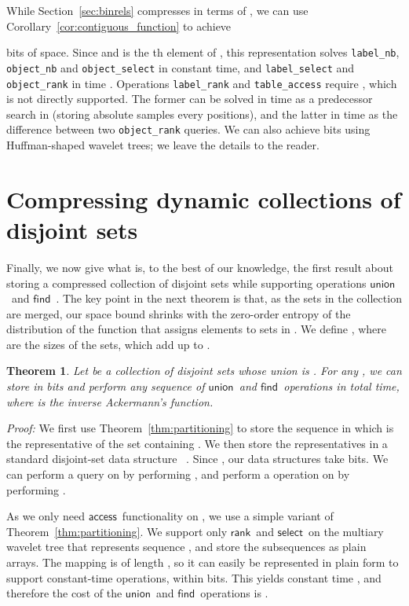 \documentclass[11pt]{article}
\newtheorem{theorem}{Theorem}
\newenvironment{proof}{\textit{Proof:}}{\hfill \paragraph{} }
\newcommand{\access}
    {\ensuremath{\mathsf{access}}}
\newcommand{\rank}
    {\ensuremath{\mathsf{rank}}}
\newcommand{\select}
    {\ensuremath{\mathsf{select}}}
\newcommand{\union}
    {\ensuremath{\mathsf{union}}}
\newcommand{\find}
    {\ensuremath{\mathsf{find}}}
\begin{document}
\begin{table}[t]
{\begin{tabular}
While Section~\ref{sec:binrels} compresses  in terms of , we can use Corollary~\ref{cor:contiguous_function} to achieve
 
bits of space. Since  and 
is the th element of , this representation solves 
{\tt label\_nb}, {\tt object\_nb} and {\tt object\_select} in constant time, 
and {\tt label\_select} and {\tt object\_rank} in time .
Operations {\tt label\_rank} and {\tt table\_access} require ,
which is not directly supported. The former can be solved in time
 as a predecessor search in 
(storing absolute samples every  positions), and the 
latter in time  as the difference between two 
{\tt object\_rank} queries.
We can also achieve 
bits using Huffman-shaped wavelet trees; we leave the details to the reader.

\section{Compressing dynamic collections of disjoint sets} \label{sec:unionfind}

Finally, we now give what is, to the best of our knowledge, the first result 
about storing a compressed collection of disjoint sets while supporting 
operations \union\ and \find~\cite{TvL84}.  The key point in the next theorem 
is that, as the sets in the collection  are merged, our space bound shrinks 
with the zero-order entropy of the distribution of the function  that 
assigns elements to sets in . We define ,
where  are the sizes of the sets, which add up to .

\begin{theorem} \label{thm:disjoint}
  Let  be a collection of disjoint sets whose union is .
For any , we can store  in 
  bits and perform any sequence of  \union\ and \find\
  operations in  total time,
  where  is the inverse Ackermann's function.
\end{theorem}

\begin{proof}
We first use
Theorem~\ref{thm:partitioning} to store the sequence  in which
 is the representative of the set containing .  We then store the 
representatives in a standard disjoint-set data structure ~\cite{TvL84}. 
Since , our data
structures take 
bits.  We can perform a query  on  by performing
, and perform a 
operation on  by performing .

As we only need \access\ functionality on , we use a simple variant of
Theorem~\ref{thm:partitioning}. We support only \rank\ and \select\ on 
the multiary wavelet tree that represents sequence , and store the 
subsequences as plain arrays. The mapping  is of length , so it
can easily be represented in plain form to support constant-time operations,
within  bits. This yields constant time , and therefore
the cost of the  \union\ and \find\ operations is 
\cite{TvL84}.


\end{proof}
\end{tabular}}
\end{table}
\end{document}
